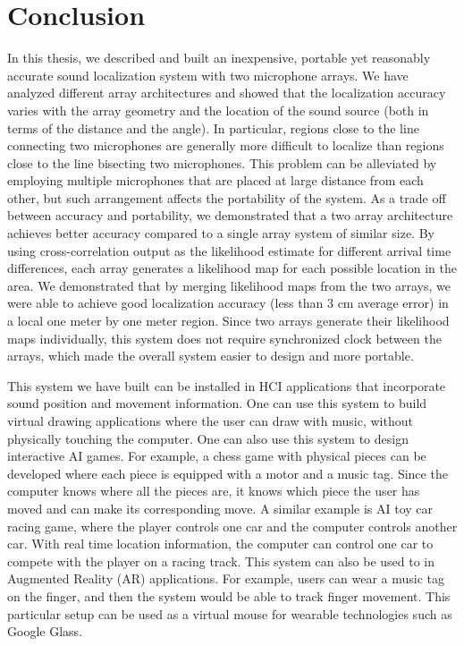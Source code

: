 \chapter{Conclusion}
In this thesis, we described and built an inexpensive, portable yet reasonably accurate sound localization system with two microphone arrays. We have analyzed different array architectures and showed that the localization accuracy varies with the array geometry and the location of the sound source (both in terms of the distance and the angle). In particular, regions close to the line connecting two microphones are generally more difficult to localize than regions close to the line bisecting two microphones. This problem can be alleviated by employing multiple microphones that are placed at large distance from each other, but such arrangement affects the portability of the system. As a trade off between accuracy and portability, we demonstrated that a two array architecture achieves better accuracy compared to a single array system of similar size. By using cross-correlation output as the likelihood estimate for different arrival time differences, each array generates a likelihood map for each possible location in the area. We demonstrated that by merging likelihood maps from the two arrays, we were able to achieve good localization accuracy (less than $3$ cm average error) in a local one meter by one meter region. Since two arrays generate their likelihood maps individually, this system does not require synchronized clock between the arrays, which made the overall system easier to design and more portable.

This system we have built can be installed in HCI applications that incorporate sound position and movement information. One can use this system to build virtual drawing applications where the user can draw with music, without physically touching the computer. One can also use this system to design interactive AI games. For example, a chess game with physical pieces can be developed where each piece is equipped with a motor and a music tag. Since the computer knows where all the pieces are, it knows which piece the user has moved and can make its corresponding move. A similar example is AI toy car racing game, where the player controls one car and the computer controls another car. With real time location information, the computer can control one car to compete with the player on a racing track. This system can also be used to in Augmented Reality (AR) applications. For example, users can wear a music tag on the finger, and then the system would be able to track finger movement. This particular setup can be used as a virtual mouse for wearable technologies such as Google Glass. 


